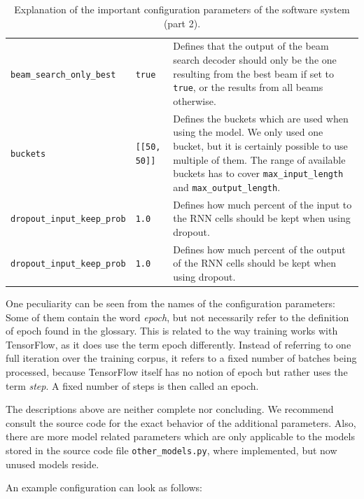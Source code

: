 \begin{table}[H]
\begin{adjustbox}{max width=\textwidth, max height=\textheight}
\begin{tabular}{llp{10cm}}
		\texttt{beam\_search\_only\_best} & \texttt{true} & Defines that the output of the beam search decoder should only be the one resulting from the best beam if set to \texttt{true}, or the results from all beams otherwise.\\
		\texttt{buckets} & \texttt{[[50, 50]]} & Defines the buckets which are used when using the model. We only used one bucket, but it is certainly possible to use multiple of them. The range of available buckets has to cover \texttt{max{\_}input\_length} and \texttt{max{\_}output\_length}.\\
		\texttt{dropout\_input\_keep\_prob} & \texttt{1.0} & Defines how much percent of the input to the RNN cells should be kept when using dropout.\\
		\texttt{dropout\_input\_keep\_prob} & \texttt{1.0} & Defines how much percent of the output of the RNN cells should be kept when using dropout.\\
		\bottomrule
		\end{tabular}
	\end{adjustbox}
	\caption{Explanation of the important configuration parameters of the software system (part 2).}
\end{table}

One peculiarity can be seen from the names of the configuration parameters: Some of them contain the word \emph{epoch}, but not necessarily refer to the definition of epoch found in the glossary. This is related to the way training works with TensorFlow, as it does use the term epoch differently. Instead of referring to one full iteration over the training corpus, it refers to a fixed number of batches being processed, because TensorFlow itself has no notion of epoch but rather uses the term \emph{step}. A fixed number of steps is then called an epoch.

The descriptions above are neither complete nor concluding. We recommend consult the source code for the exact behavior of the additional parameters. Also, there are more model related parameters which are only applicable to the models stored in the source code file \texttt{other\_models.py}, where implemented, but now unused models reside.

\clearpage

An example configuration can look as follows:

